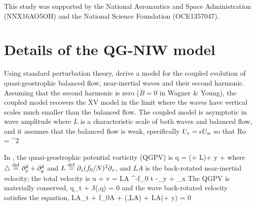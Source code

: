 \documentclass{jfm}
\begin{document}




%
%
\vspace{1.cm}
This study was supported by the National Aeronautics and Space Administration (NNX16AO5OH)
and the National Science Foundation (OCE1357047).

%
%

\appendix

\section{Details of the QG-NIW model}

Using standard perturbation theory, \cite{wagner_young2016} derive a
model for the coupled evolution of quasi-geostrophic balanced flow, near-inertial
waves and their second harmonic. Assuming that the second harmonic is zero ($B=0$
in Wagner \& Young), the \cite{wagner_young2016} coupled model recovers the XV
model in the limit where the waves have vertical scales much smaller than the balanced
flow. The coupled model is asymptotic in wave amplitude
\beq
\ep {} {} \com
\eeq
where $L$ is a characteristic scale of both waves and balanced flow,
and it assumes that the balanced flow is weak, specifically $U_e = \epsilon U_w$ so that
\beq
Ro  {} = \ep^2\per
\eeq

In \cite{wagner_young2016}, the quasi-geostrophic potential vorticity (QGPV) is
\beq\label{qgpv_wy}
q = (\lap + L)\psi + \beta y + \com
\eeq
where $\triangle \stackrel{\mathrm{def}}{=} \partial_x^2 + \partial_y^2$ and $L\stackrel{\mathrm{def}}{=} \partial_z (f_0/N)^2 \partial_z$, and $LA$
is the back-rotated near-inertial velocity; the total velocity is
\beq
u + \ii v = LA \ee^{-\ii f_0 t} -\psi_y + \ii\psi_x\per
\eeq
The QGPV is materially conserved,
\beq
q_t + J(\psi,q) = 0\com
\eeq
and the wave back-rotated velocity satisfies the \cite{young_benjelloul1997}
equation,
\beq
LA_t + f_0\lap A + \sJ(\psi,LA) + \ii LA(\half\lap\psi + \beta y)
= 0\per
\eeq
\end{document}
